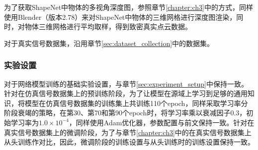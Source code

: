为了获取ShapeNet中物体的多视角深度图，参照章节\ref{chapter:ch3}中的方式，同样使用Blender（版本2.78）来对ShapeNet中物体的三维网格进行深度图渲染，同时，对物体三维网格进行平均取样，得到致密真实点云数据。

对于真实信号数据集，沿用章节\ref{sec:dataset_collection}中的数据集。
\subsubsection{实验设置}
对于网络模型训练的基础实验设置，与章节\ref{sec:experiment_setup}中保持一致。针对在仿真信号数据集上的预训练阶段，为了让模型在源域上学习到足够的通用知识，将模型在仿真信号数据集的训练集上共训练110个epoch，同样采取学习率分阶段衰竭的策略，在第30、第70和第90个epoch时，将学习率乘以衰减因子0.3，初始学习率为$1.0\times 10^{-4}$，同样使用Adam优化器，参数配置与前文保持一致。针对在真实信号数据集上的微调阶段，为了与章节\ref{chapter:ch3}中的在真实信号数据集上从头训练作对比，因此，微调阶段的训练设置与从头训练时的训练设置保持一致。
